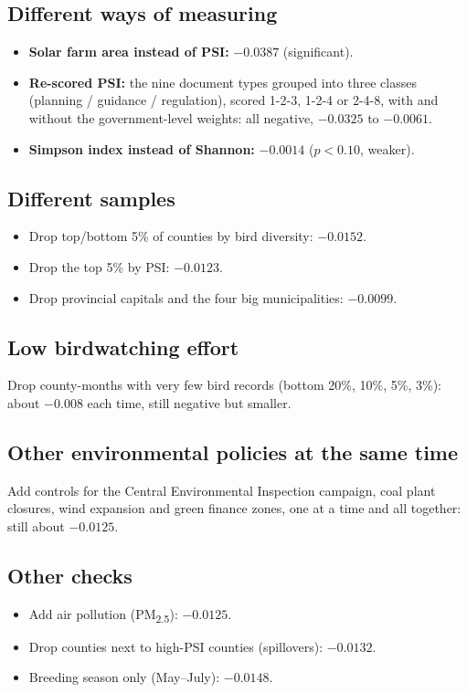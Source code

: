 \documentclass[11pt]{article}
\begin{document}
\subsection{Different ways of measuring}
\begin{itemize}
\item \textbf{Solar farm area instead of PSI:} $-0.0387$ (significant).
\item \textbf{Re-scored PSI:} the nine document types grouped into three classes (planning / guidance / regulation), scored 1-2-3, 1-2-4 or 2-4-8, with and without the government-level weights: all negative, $-0.0325$ to $-0.0061$.
\item \textbf{Simpson index instead of Shannon:} $-0.0014$ ($p<0.10$, weaker).
\end{itemize}

\subsection{Different samples}
\begin{itemize}
\item Drop top/bottom 5\% of counties by bird diversity: $-0.0152$.
\item Drop the top 5\% by PSI: $-0.0123$.
\item Drop provincial capitals and the four big municipalities: $-0.0099$.
\end{itemize}

\subsection{Low birdwatching effort}
Drop county-months with very few bird records (bottom 20\%, 10\%, 5\%, 3\%): about $-0.008$ each time, still negative but smaller.

\subsection{Other environmental policies at the same time}
Add controls for the Central Environmental Inspection campaign, coal plant closures, wind expansion and green finance zones, one at a time and all together: still about $-0.0125$.

\subsection{Other checks}
\begin{itemize}
\item Add air pollution (PM\textsubscript{2.5}): $-0.0125$.
\item Drop counties next to high-PSI counties (spillovers): $-0.0132$.
\item Breeding season only (May--July): $-0.0148$.
\end{itemize}
\end{document}
